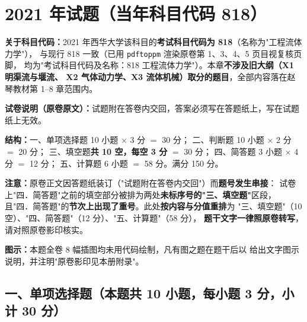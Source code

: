 \chapter{2021 年试题（当年科目代码 818）}

\begin{tishi}
\textbf{关于科目代码：}2021 年西华大学该科目的\textbf{考试科目代码为 818}（名称为"工程流体力学"），
与现行 818 一致（已用 \texttt{pdftoppm} 渲染原卷第 1、3、4、5 页目视复核页脚，
均为"考试科目代码及名称：818 工程流体力学"）。本章\textbf{不涉及旧大纲（X1 明渠流与堰流、
X2 气体动力学、X3 流体机械）取分的题目}，全部内容落在赵琴教材第 1--8 章范围内。

\textbf{试卷说明（原卷原文）：}试题附在答卷内交回，答案必须写在答题纸上，写在试题纸上无效。

\textbf{结构：}一、单项选择题 10 小题 \(\times\) 3 分 \(=\) 30 分；
二、判断题 10 小题 \(\times\) 2 分 \(=\) 20 分；
三、填空题\textbf{共 10 空，每空 3 分} \(=\) 30 分；
四、简答题 3 小题 \(\times\) 4 分 \(=\) 12 分；
五、计算题 6 小题 \(=\) 58 分。满分 150 分。

\textbf{注意：}原卷正文因答题纸装订（"试题附在答卷内交回"）而\textbf{题号发生串接}：
试卷上"四．简答题"之前的填空部分被排为两处\textbf{未标序号的"三、填空题"}区段，
且"四．简答题"的\textbf{节次上出现了重号}。此处\textbf{按内容与分值重排}为
"三、填空题"（10 空）、"四、简答题"（12 分）、"五、计算题"（58 分），
\textbf{题干文字一律照原卷转写}，请对照原卷影印核实。

\textbf{图示：}本题全卷 8 幅插图均未用代码绘制，凡有图之题在题干后以
\tuyi{} 给出文字图示说明，并注明"原卷影印见本册附录"。
\end{tishi}

\section{一、单项选择题（本题共 10 小题，每小题 3 分，小计 30 分）}

